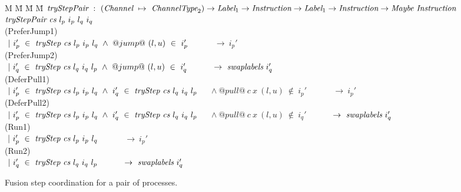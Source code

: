 
\newcommand\nextStep[5]{\big((#1,~#2),~(#3,~#4),~#5 \big)}


\newcommand\note[1]{\textcolor{notec}{(#1)}}

\begin{figure*}
\begin{tabbing}
M \= M \= M \= M \kill
$\textit{tryStepPair} ~:~ (\textit{Channel} ~\mapsto~ \textit{ChannelType}_2) \to \textit{Label}_1 \to \textit{Instruction} \to \textit{Label}_1 \to \textit{Instruction} \to \textit{Maybe}~\textit{Instruction}$ \\
$\textit{tryStepPair} ~\textit{cs}~l_p~i_p~l_q~i_q$ \\

\> \note{PreferJump1} \\
\> $~|~i_p'~\in~\textit{tryStep}~\textit{cs}~l_p~i_p~l_q ~\wedge~@jump@~(l,u)~\in~i_p'$ 
   ~~~~~ $\to~i_p'$ \\
\> \note{PreferJump2} \\
\> $~|~i_q'~\in~\textit{tryStep}~\textit{cs}~l_q~i_q~l_p ~\wedge~@jump@~(l,u)~\in~i_q'$
   ~~~~~ $\to~\textit{swaplabels}~i_q'$ 
\\[0.5em]

\> \note{DeferPull1} \\
\> $~|~i_p'~\in~\textit{tryStep}~\textit{cs}~l_p~i_p~l_q ~\wedge~ i_q'~\in~\textit{tryStep}~\textit{cs}~l_q~i_q~l_p$ 
   ~~ $\wedge~@pull@~c~x~(l,u)~\not\in~i_p'$ 
   ~~~~~ $\to~i_p'$ \\
\> \note{DeferPull2} \\
\> $~|~i_p'~\in~\textit{tryStep}~\textit{cs}~l_p~i_p~l_q ~\wedge~i_q'~\in~\textit{tryStep}~\textit{cs}~l_q~i_q~l_p$
   ~~ $\wedge~@pull@~c~x~(l,u)~\not\in~i_q'$ 
   ~~~~~ $\to~\textit{swaplabels}~i_q'$ 
\\[0.5em]

\> \note{Run1} \\
\> $~|~i_p'~\in~\textit{tryStep}~\textit{cs}~l_p~i_p~l_q$ ~~~~~ $\to~i_p'$ \\
\> \note{Run2} \\
\> $~|~i_q'~\in~\textit{tryStep}~\textit{cs}~l_q~i_q~l_p$ ~~~~~ $\to~\textit{swaplabels}~i_q'$
\end{tabbing}
\caption{Fusion step coordination for a pair of processes.}
\label{fig:Fusion:Def:StepPair}
\end{figure*}

